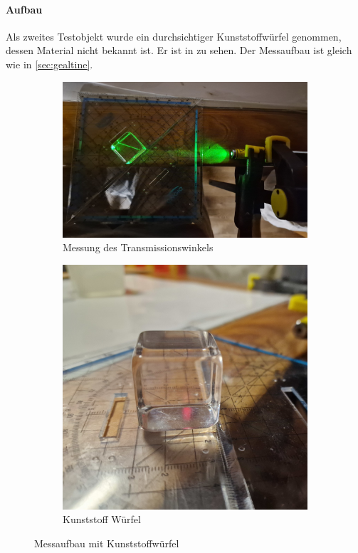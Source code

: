 \documentclass[colorlinks = true, allcolors = black, ngerman, 11pt,
a4paper, twoside, titlepage]{article}
\numberwithin{figure}{section}
\begin{document}
	\paragraph{Aufbau}
	Als zweites Testobjekt wurde ein durchsichtiger Kunststoffwürfel
	genommen, dessen Material nicht bekannt ist. Er ist in zu sehen. Der
	Messaufbau ist gleich wie in \cref{sec:gealtine}.
	\begin{figure}[h]
		\centering
		\begin{subfigure}{0.4\textwidth}
			\centering
			\includegraphics[height=0.7\linewidth]{imgs/winkel_messen_wurfel}
			\caption{Messung des Transmissionswinkels}
			\label{fig:winkelmessenwurfel}
		\end{subfigure}%
		\hfil
		\begin{subfigure}{0.4\textwidth}
			\centering
			\includegraphics[height=0.7\linewidth]{imgs/wurfel_ansicht}
			\caption{Kunststoff Würfel}
			\label{fig:wurfelansicht}
		\end{subfigure}
		\caption{Messaufbau mit Kunststoffwürfel}
		\label{figs:wurfelansichten}
	\end{figure}
	
\end{document}
